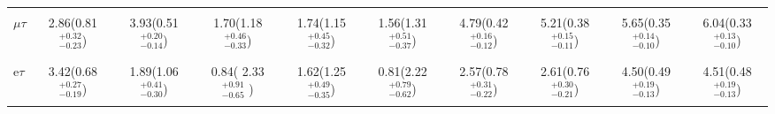 \documentclass{beamer}
\begin{document}
\begin{frame}
\begin{table}
{{\begin{tabular}{| l | c | c | c | c | c | c | c | c | c |}
                       &                                                               &                       &                     &                         &                                        &                                  &                         &                                               &                      \\ 
$ {\mu\tau}$  & 2.86(0.81 \boldmath${^{+0.32}_{-0.23}}$) &  3.93(0.51 \boldmath${^{+0.20}_{-0.14}}$) &  1.70(1.18 \boldmath${^{+0.46}_{-0.33}}$) &  1.74(1.15 \boldmath${^{+0.45}_{-0.32}}$) &  1.56(1.31 \boldmath${^{+0.51}_{-0.37}}$)                                                                                                              &  4.79(0.42 \boldmath${^{+0.16}_{-0.12}}$) &  5.21(0.38 \boldmath${^{+0.15}_{-0.11}}$) &  5.65(0.35 \boldmath${^{+0.14}_{-0.10}}$) & 6.04(0.33 \boldmath${^{+0.13}_{-0.10}}$) \\ 
                       &                                                               &                       &                     &                         &                                        &                                  &                         &                                               &                      \\ \hline
                       &                                                               &                       &                     &                         &                                        &                                  &                         &                                               &                      \\ 
e${\tau}$        & 3.42(0.68 \boldmath${^{+0.27}_{-0.19}}$) &  1.89(1.06 \boldmath${^{+0.41}_{-0.30}}$) &  0.84( 2.33 \boldmath${^{+0.91}_{-0.65}}$ ) &  1.62(1.25 \boldmath${^{+0.49}_{-0.35}}$) &  0.81(2.22 \boldmath${^{+0.79}_{-0.62}}$)                                                                                                              &  2.57(0.78 \boldmath${^{+0.31}_{-0.22}}$) &  2.61(0.76 \boldmath${^{+0.30}_{-0.21}}$) &  4.50(0.49 \boldmath${^{+0.19}_{-0.13}}$) & 4.51(0.48 \boldmath${^{+0.19}_{-0.13}}$) \\ 
                      &                                                               &                       &                     &                         &                                        &                                  &                         &                                               &                      \\ \hline


\end{tabular}}}
\end{table}
\end{frame}
\end{document}
